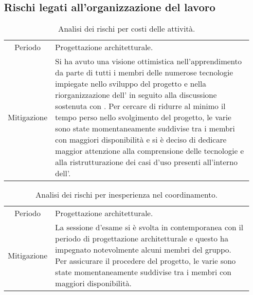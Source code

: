 \subsection{Rischi legati all'organizzazione del lavoro}
\begin{table}[H]
	\centering
	\begin{tabular}{|c|p{11.5cm}|}
		\rowcolor{darkblue} \hline
		\multicolumn{2}{|c|}{\textcolor{white}{\textbf{RO1 - Costi delle attività}}}\\ \hline
		Periodo & Progettazione architetturale.\\ \hline
		Mitigazione & Si ha avuto una visione ottimistica nell'apprendimento da parte di tutti i membri delle numerose tecnologie impiegate nello sviluppo del progetto e nella riorganizzazione dell'\AdR{} in seguito alla discussione sostenuta con \CR{}. Per cercare di ridurre al minimo il tempo perso nello svolgimento del progetto, le varie \glo{attività} sono state momentaneamente suddivise tra i membri con maggiori disponibilità e si è deciso di dedicare maggior attenzione alla comprensione delle tecnologie e alla ristrutturazione dei casi d'uso presenti all'interno dell'\AdR{}.\\ \hline
	\end{tabular}
	\caption{\label{tab:ARO1}Analisi dei rischi per costi delle attività.}
\end{table}
\begin{table}[H]
	\centering
	\begin{tabular}{|c|p{11.5cm}|}
		\rowcolor{darkblue} \hline
		\multicolumn{2}{|c|}{\textcolor{white}{\textbf{RG2 - Disponibilità dei membri}}}\\ \hline
		Periodo & Progettazione architetturale.\\ \hline
		Mitigazione & La sessione d'esame si è svolta in contemporanea con il periodo di progettazione architetturale e questo ha impegnato notevolmente alcuni membri del gruppo. Per assicurare il procedere del progetto, le varie \glo{attività} sono state momentaneamente suddivise tra i membri con maggiori disponibilità.\\ \hline
	\end{tabular}
	\caption{\label{tab:ARO2}Analisi dei rischi per inesperienza nel coordinamento.}
\end{table}
